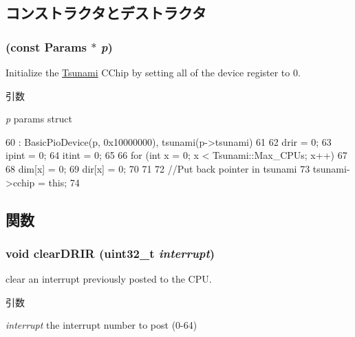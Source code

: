 \subsection{コンストラクタとデストラクタ}
\hypertarget{classTsunamiCChip_ab55992bfee06f9d23385fad4a1f6f197}{
\subsubsection[{TsunamiCChip}]{ (const {\bf Params} $\ast$ {\em p})}}
\label{classTsunamiCChip_ab55992bfee06f9d23385fad4a1f6f197}
Initialize the \hyperlink{classTsunami}{Tsunami} CChip by setting all of the device register to 0. 
\begin{DoxyParams}{引数}
\item[{\em p}]params struct \end{DoxyParams}



\begin{DoxyCode}
60     : BasicPioDevice(p, 0x10000000), tsunami(p->tsunami)
61 {
62     drir = 0;
63     ipint = 0;
64     itint = 0;
65 
66     for (int x = 0; x < Tsunami::Max_CPUs; x++)
67     {
68         dim[x] = 0;
69         dir[x] = 0;
70     }
71 
72     //Put back pointer in tsunami
73     tsunami->cchip = this;
74 }
\end{DoxyCode}


\subsection{関数}
\hypertarget{classTsunamiCChip_a75bd270f0ce8d71afe064fa3b4128c26}{
\subsubsection[{clearDRIR}]{\setlength{\rightskip}{0pt plus 5cm}void clearDRIR ({\bf uint32\_\-t} {\em interrupt})}}
\label{classTsunamiCChip_a75bd270f0ce8d71afe064fa3b4128c26}
clear an interrupt previously posted to the CPU. 
\begin{DoxyParams}{引数}
\item[{\em interrupt}]the interrupt number to post (0-\/64) \end{DoxyParams}



